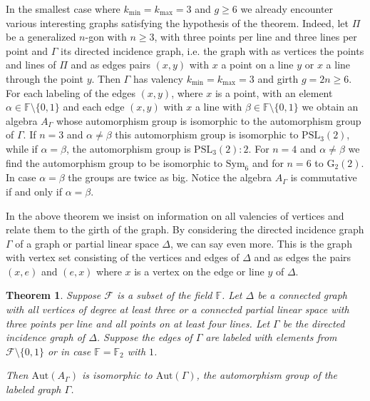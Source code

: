\documentclass[oneside,a4paper]{amsart} %
\newtheorem{theorem}[proposition]{Theorem}
\theoremstyle{definition}
\begin{document}
In the smallest case where $k_\mathrm{min}=k_\mathrm{max}=3$ and $g\geq 6$ we already encounter various  interesting graphs
satisfying the hypothesis of the theorem. 
Indeed, let $\Pi$ be a generalized $n$-gon with $n\geq 3$, with three points per line and three lines per point
and $\Gamma$ its directed incidence graph, i.e. the graph with as vertices the points and lines of $\Pi$ and as edges  pairs $(x,y)$ with $x$ a point on a line $y$ or $x$ a line through the point $y$. Then $\Gamma$ has valency $k_\mathrm{min}=k_\mathrm{max}=3$ and girth $g=2n\geq 6$.
For each labeling of the edges $(x,y)$, where $x$ is a point, with  an element $\alpha\in \mathbb{F}\setminus\{0,1\}$ and each edge $(x,y)$ with $x$ a line
with $\beta\in \mathbb{F}\setminus\{0,1\}$  we obtain an algebra $A_\Gamma$ whose automorphism group is isomorphic to
the automorphism group of $\Gamma$.  
If $n=3$ and $\alpha\neq \beta$ this automorphism group is isomorphic to $\mathrm{PSL}_3(2)$, while if $\alpha=\beta$,
the automorphism group is $\mathrm{PSL}_3(2):2$.
For $n=4$ and $\alpha\neq \beta$ we find the automorphism group to be isomorphic to $\mathrm{Sym}_6$ and for $n=6$ to $\mathrm{G}_2(2)$.
In case $\alpha=\beta$
the groups are twice as big.
Notice the algebra $A_\Gamma$ is commutative if and only if $\alpha=\beta$.



In the above theorem we insist on information on all valencies of vertices and relate them to the girth of the graph. By considering
the directed incidence graph $\Gamma$ of a graph or partial linear space $\Delta$,  we can say even more.
This is the graph with vertex set consisting of the  vertices and edges of $\Delta$ and as edges the pairs $(x,e)$ and $(e,x)$ where $x$ is a vertex on the edge or line $y$ of  $\Delta$. 



\begin{theorem}\label{incgraphthm}
Suppose $\mathcal{F}$ is a subset of  the field $\mathbb{F}$.
Let $\Delta$ be a connected graph with all vertices  of degree at least three or a connected partial linear space with three points per line and all points on at least four lines.
Let $\Gamma$ be the directed incidence graph of $\Delta$.
Suppose the edges of $\Gamma$ are labeled with elements from  $\mathcal{F}\setminus\{0,1\}$ or in case $\mathbb{F}=\mathbb{F}_2$ with $1$.

Then $\mathrm{Aut}(A_{\Gamma})$ is isomorphic to  $\mathrm{Aut}(\Gamma)$, the automorphism group of the labeled graph $\Gamma$.
\end{theorem}
\end{document}
